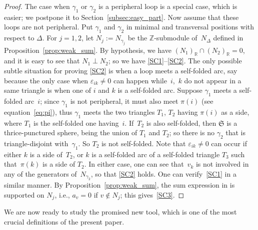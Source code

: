 \documentclass[pdftex]{sigma}
\numberwithin{equation}{section}
\theoremstyle{definition}
\begin{document}
\begin{proof} The case when $\gamma_1$ or $\gamma_2$ is a peripheral loop is a special case, which is easier; we postpone it to Section~\ref{subsec:easy_part}. Now assume that these loops are not peripheral. Put $\gamma_1$ and $\gamma_2$ in minimal and transversal positions with respect to $\Delta$. For $j=1,2$, let $N_j := N_{\gamma_j}$ be the $\mathbb{Z}$-submodule of~$N_\Delta$ defined in Proposition~\ref{prop:weak_sum}. By hypothesis, we have $(N_1)_\mathbb{R} \cap (N_2)_\mathbb{R}=0$, and it is easy to see that $N_1 \perp N_2$; so we have \ref{SC1}--\ref{SC2}. The only possible subtle situation for proving \ref{SC2} is when a loop meets a self-folded arc, say because the only case when $\varepsilon_{ik} \neq 0$ can happen while~$i$,~$k$ do not appear in a same triangle is when one of $i$ and $k$ is a self-folded arc. Suppose $\gamma_1$ meets a self-folded arc~$i$; since $\gamma_1$ is not peripheral, it must also meet $\pi(i)$ (see equation~\eqref{eq:pi}), thus $\gamma_1$ meets the two triangles $T_1$, $T_2$ having $\pi(i)$ as a side, where $T_1$ is the self-folded one having~$i$. If~$T_2$ is also self-folded, then $\mathfrak{S}$ is a thrice-punctured sphere, being the union of $T_1$ and $T_2$; so there is no $\gamma_2$ that is triangle-disjoint with~$\gamma_1$. So $T_2$ is not self-folded. Note that $\varepsilon_{ik} \neq 0$ can occur if either $k$ is a side of~$T_2$, or $k$ is a self-folded arc of a self-folded triangle $T_3$ such that~$\pi(k)$ is a side of $T_2$. In either case, one can see that~$v_k$ is not involved in any of the generators of~$N_{\gamma_2}$, so that \ref{SC2} holds. One can verify~\ref{SC1} in a similar manner.
By Proposition~\ref{prop:weak_sum}, the sum expression in  is supported on $N_j$, i.e., $a_v =0$ if $v \notin N_j$; this gives~\ref{SC3}.
\end{proof}
We are now ready to study the promised new tool, which is one of the most crucial definitions of the present paper.
\end{document}
